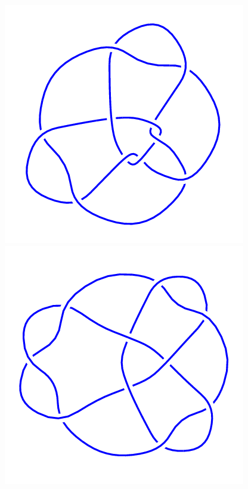 \begin{figure}[H]
\begin{minipage}[b]{.18\linewidth}
	\end{minipage}
	\begin{minipage}[b]{.18\linewidth}
		\centering
		\includegraphics[width=\linewidth]{../data/10_99.png}
	\end{minipage}
	\begin{minipage}[b]{.18\linewidth}
		\centering
		\includegraphics[width=\linewidth]{../data/10_100.png}

\end{minipage}
\end{figure}
